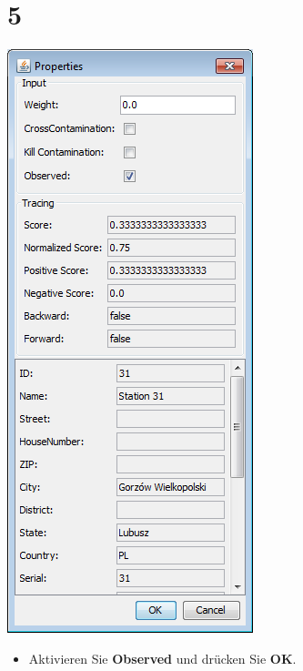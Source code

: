 \documentclass{beamer}
\begin{document}
\section{5}
\begin{frame}
	\begin{center}
  		\includegraphics[height=0.6\textheight]{5.png}
	\end{center}
	\begin{itemize}
		\item Aktivieren Sie \textbf{Observed} und drücken Sie \textbf{OK}.
	\end{itemize}
\end{frame}
\end{document}
